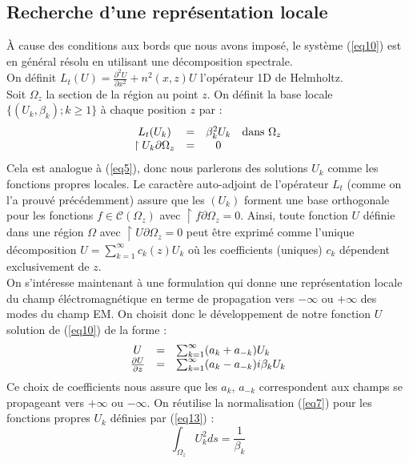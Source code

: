 \documentclass{article}
\begin{document}
\subsection{Recherche d'une représentation locale}
À cause des conditions aux bords que nous avons imposé, le système (\ref{eq10}) est en général résolu en utilisant une décomposition spectrale.\\
On définit $L_t(U)=\frac{\partial^2U}{\partial x^2}+n^2(x,z)U$ l'opérateur 1D de Helmholtz.\\
Soit $\Omega_z$ la section de la région au point $z$. On définit la base locale $\{(U_k,\beta_k);k\geq 1\}$ à chaque position $z$ par : 
\begin{equation} \label{eq13}
	\begin{array}{c c c c}
		L_t(U_k)&=&\beta_k^2U_k &\text{dans } \Omega_z\\
		\restriction{U_k}{\partial\Omega_z}&=&0
	\end{array}
\end{equation}
Cela est analogue à (\ref{eq5}), donc nous parlerons des solutions $U_k$ comme les fonctions propres locales. Le caractère auto-adjoint de l'opérateur $L_t$ (comme on l'a prouvé précédemment) assure que les $(U_k)$ forment une base orthogonale pour les fonctions $f\in\mathscr{C}(\Omega_z)$ avec $\restriction{f}{\partial\Omega_z}=0$. Ainsi, toute fonction $U$ définie dans une région $\Omega$ avec $\restriction{U}{\partial\Omega_z}=0$ peut être exprimé comme l'unique décomposition $U=\sum_{k=1}^\infty c_k(z)U_k$ où les coefficients (uniques) $c_k$ dépendent exclusivement de $z$.\\
On s'intéresse maintenant à une formulation qui donne une représentation locale du champ éléctromagnétique en terme de propagation vers $-\infty$ ou $+\infty$ des modes du champ EM.
On choisit donc le développement de notre fonction $U$ solution de (\ref{eq10}) de la forme :
\begin{equation}\label{eq14}
\begin{array}{c c l}
U&=&\sum_{k=1}^\infty (a_k+a_{-k})U_k\\
\frac{\partial U}{\partial z}&=&\sum_{k=1}^\infty (a_k-a_{-k})i\beta_kU_k
\end{array}
\end{equation}
Ce choix de coefficients nous assure que les $a_k$, $a_{-k}$ correspondent aux champs se propageant vers $+\infty$ ou $-\infty$. On réutilise la normalisation (\ref{eq7}) pour les fonctions propres $U_k$ définies par (\ref{eq13}) :
\begin{equation}\label{eq15}
	\int_{\Omega_z} U_k^2ds=\frac{1}{\beta_k}
\end{equation}
\end{document}

